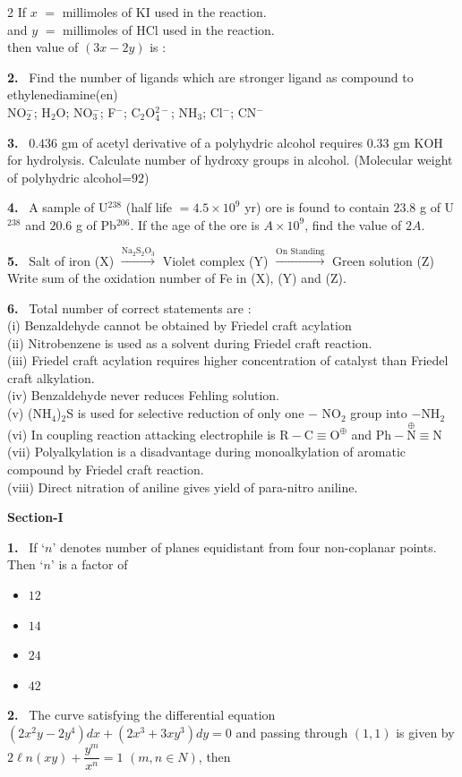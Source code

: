 \documentclass[10pt]{extarticle}
\newcommand{\partsec}[2]{\par\medskip\noindent{\large\bfseries PART-#1: #2}\par\smallskip}
\newcommand{\sect}[1]{\par\smallskip\noindent\textbf{#1}\par}
\newcommand{\qn}[1]{\par\smallskip\noindent\textbf{#1.}~}
\newenvironment{qoptions}{\begin{itemize}[leftmargin=1.8em,itemsep=1pt,topsep=2pt,label={}]}{\end{itemize}}
\newcommand{\opt}[2]{\item[(#1)] #2}
\begin{document}
\begin{multicols}{2}
If $x$ $=$ millimoles of KI used in the reaction.\\
and $y$ $=$ millimoles of HCl used in the reaction.\\
then value of $(3x-2y)$ is :
\qn{2} Find the number of ligands which are stronger ligand as compound to ethylenediamine(en)\\
NO$_2^-$; H$_2$O; NO$_3^-$; F$^-$; C$_2$O$_4^{2-}$; NH$_3$; Cl$^-$; CN$^-$
\qn{3} $0.436$ gm of acetyl derivative of a polyhydric alcohol requires $0.33$ gm KOH for hydrolysis. Calculate number of hydroxy groups in alcohol. (Molecular weight of polyhydric alcohol=$92$)
\qn{4} A sample of U$^{238}$ (half life $=4.5\times10^9$ yr) ore is found to contain $23.8$ g of U$^{238}$ and $20.6$ g of Pb$^{206}$. If the age of the ore is $A\times10^9$, find the value of $2A$.
\qn{5} Salt of iron (X) $\xrightarrow{\text{Na}_2\text{S}_2\text{O}_3}$ Violet complex (Y) $\xrightarrow{\text{On Standing}}$ Green solution (Z)\\
Write sum of the oxidation number of Fe in (X), (Y) and (Z).
\qn{6} Total number of correct statements are :\\
(i) Benzaldehyde cannot be obtained by Friedel craft acylation\\
(ii) Nitrobenzene is used as a solvent during Friedel craft reaction.\\
(iii) Friedel craft acylation requires higher concentration of catalyst than Friedel craft alkylation.\\
(iv) Benzaldehyde never reduces Fehling solution.\\
(v) (NH$_4$)$_2$S is used for selective reduction of only one $-$ NO$_2$ group into $-$NH$_2$\\
(vi) In coupling reaction attacking electrophile is $\mathrm{R{-}C{\equiv}O^{\oplus}}$ and $\mathrm{Ph{-}\overset{\oplus}{N}{\equiv}N}$\\
(vii) Polyalkylation is a disadvantage during monoalkylation of aromatic compound by Friedel craft reaction.\\
(viii) Direct nitration of aniline gives yield of para-nitro aniline.
\partsec{3}{MATHEMATICS}
\sect{Section-I}
\qn{1} If `$n$' denotes number of planes equidistant from four non-coplanar points. Then `$n$' is a factor of
\begin{qoptions}
\opt{A}{$12$}
\opt{B}{$14$}
\opt{C}{$24$}
\opt{D}{$42$}
\end{qoptions}
\qn{2} The curve satisfying the differential equation $\left(2x^2y-2y^4\right)dx+\left(2x^3+3xy^3\right)dy=0$ and passing through $(1,1)$ is given by $2\ell n(xy)+\dfrac{y^m}{x^n}=1$ $(m,n\in N)$, then

\end{multicols}
\end{document}

